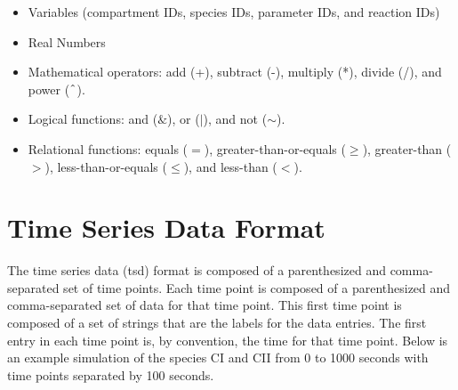 \documentclass[titlepage,11pt]{article}
\begin{document}
\begin{itemize}
\item Variables (compartment IDs, species IDs, parameter IDs, and reaction IDs)
\item Real Numbers
\item Mathematical operators: add (+), subtract (-), multiply (*), divide (/), and power ($\char`\^$).
\item Logical functions: and ($\&$), or ($|$), and not ($\sim$).
\item Relational functions: equals ($=$), greater-than-or-equals ($\geq$), greater-than ($>$), less-than-or-equals ($\leq$), and less-than ($<$).
\end{itemize}

\section{\label{TSD}Time Series Data Format}

\noindent
The time series data (tsd) format is composed of a parenthesized and comma-separated set of time points. Each time point is composed of a parenthesized and comma-separated set of data for that time point. This first time point is composed of a set of strings that are the labels for the data entries. The first entry in each time point is, by convention, the time for that time point. Below is an example simulation of the species CI and CII from 0 to 1000 seconds with time points separated by 100 seconds. 
\end{document}
